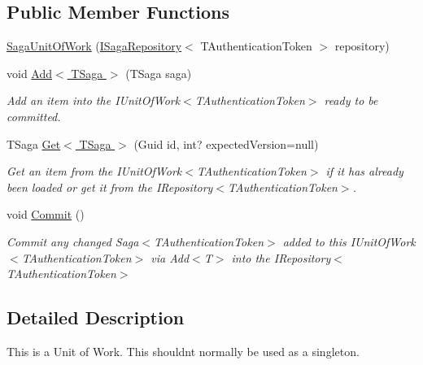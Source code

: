 \subsection*{Public Member Functions}
\begin{DoxyCompactItemize}
\item 
\hyperlink{classCqrs_1_1Domain_1_1SagaUnitOfWork_ae2340d3bc97745c71d4854cb24115e93_ae2340d3bc97745c71d4854cb24115e93}{Saga\+Unit\+Of\+Work} (\hyperlink{interfaceCqrs_1_1Domain_1_1ISagaRepository}{I\+Saga\+Repository}$<$ T\+Authentication\+Token $>$ repository)
\item 
void \hyperlink{classCqrs_1_1Domain_1_1SagaUnitOfWork_af62fee98e76ec58ec4d684b36eb7b20e_af62fee98e76ec58ec4d684b36eb7b20e}{Add$<$ T\+Saga $>$} (T\+Saga saga)
\begin{DoxyCompactList}\small\item\em Add an item into the I\+Unit\+Of\+Work$<$\+T\+Authentication\+Token$>$ ready to be committed. \end{DoxyCompactList}\item 
T\+Saga \hyperlink{classCqrs_1_1Domain_1_1SagaUnitOfWork_acebe159e3b27e36a91909e97cf37d28d_acebe159e3b27e36a91909e97cf37d28d}{Get$<$ T\+Saga $>$} (Guid id, int? expected\+Version=null)
\begin{DoxyCompactList}\small\item\em Get an item from the I\+Unit\+Of\+Work$<$\+T\+Authentication\+Token$>$ if it has already been loaded or get it from the I\+Repository$<$\+T\+Authentication\+Token$>$. \end{DoxyCompactList}\item 
void \hyperlink{classCqrs_1_1Domain_1_1SagaUnitOfWork_aed2756dadfe0a0903a791944d02c4db8_aed2756dadfe0a0903a791944d02c4db8}{Commit} ()
\begin{DoxyCompactList}\small\item\em Commit any changed Saga$<$\+T\+Authentication\+Token$>$ added to this I\+Unit\+Of\+Work$<$\+T\+Authentication\+Token$>$ via Add$<$\+T$>$ into the I\+Repository$<$\+T\+Authentication\+Token$>$ \end{DoxyCompactList}\end{DoxyCompactItemize}


\subsection{Detailed Description}
This is a Unit of Work. This shouldn\textquotesingle{}t normally be used as a singleton. 



